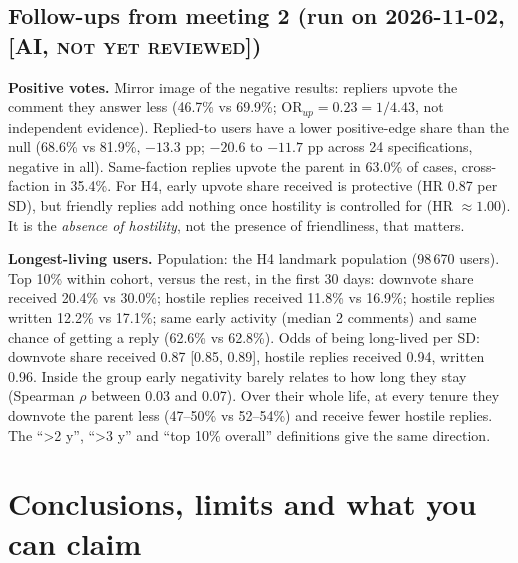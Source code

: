\documentclass[11pt,a4paper]{article}
\newcommand{\status}[1]{\textsc{\small #1}}
\begin{document}
\subsection{Follow-ups from meeting 2 (run on 2026-11-02, \status{[AI, not yet reviewed]})}
\textbf{Positive votes.} Mirror image of the negative results: repliers upvote the comment they answer less (46.7\% vs 69.9\%; $\mathrm{OR}_{up}=0.23=1/4.43$, not independent evidence). Replied-to users have a lower positive-edge share than the null (68.6\% vs 81.9\%, $-13.3$ pp; $-20.6$ to $-11.7$ pp across 24 specifications, negative in all). Same-faction replies upvote the parent in 63.0\% of cases, cross-faction in 35.4\%. For H4, early upvote share received is protective (HR 0.87 per SD), but friendly replies add nothing once hostility is controlled for (HR $\approx1.00$). It is the \emph{absence of hostility}, not the presence of friendliness, that matters.

\textbf{Longest-living users.} Population: the H4 landmark population (98\,670 users). Top 10\% within cohort, versus the rest, in the first 30 days: downvote share received 20.4\% vs 30.0\%; hostile replies received 11.8\% vs 16.9\%; hostile replies written 12.2\% vs 17.1\%; same early activity (median 2 comments) and same chance of getting a reply (62.6\% vs 62.8\%). Odds of being long-lived per SD: downvote share received 0.87 [0.85, 0.89], hostile replies received 0.94, written 0.96. Inside the group early negativity barely relates to how long they stay (Spearman $\rho$ between 0.03 and 0.07). Over their whole life, at every tenure they downvote the parent less (47--50\% vs 52--54\%) and receive fewer hostile replies. The ``>2 y'', ``>3 y'' and ``top 10\% overall'' definitions give the same direction.

\section{Conclusions, limits and what you can claim}\label{sec:conclusions}
\end{document}

